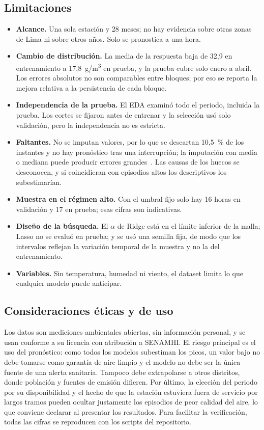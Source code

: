 \subsection{Limitaciones}
\begin{itemize}
\item \textbf{Alcance.} Una sola estación y 28 meses; no hay evidencia sobre otras zonas de Lima ni sobre otros años. Solo se pronostica a una hora.
\item \textbf{Cambio de distribución.} La media de la respuesta baja de 32,9 en entrenamiento a 17,8~\textmu g/m\textsuperscript{3} en prueba, y la prueba cubre solo enero a abril. Los errores absolutos no son comparables entre bloques; por eso se reporta la mejora relativa a la persistencia de cada bloque.
\item \textbf{Independencia de la prueba.} El EDA examinó todo el periodo, incluida la prueba. Los cortes se fijaron antes de entrenar y la selección usó solo validación, pero la independencia no es estricta.
\item \textbf{Faltantes.} No se imputan valores, por lo que se descartan 10,5~\% de los instantes y no hay pronóstico tras una interrupción; la imputación con media o mediana puede producir errores grandes~\cite{hua2024}. Las causas de los huecos se desconocen, y si coincidieran con episodios altos los descriptivos los subestimarían.
\item \textbf{Muestra en el régimen alto.} Con el umbral fijo solo hay 16 horas en validación y 17 en prueba; esas cifras son indicativas.
\item \textbf{Diseño de la búsqueda.} El $\alpha$ de Ridge está en el límite inferior de la malla; Lasso no se evaluó en prueba; y se usó una semilla fija, de modo que los intervalos reflejan la variación temporal de la muestra y no la del entrenamiento.
\item \textbf{Variables.} Sin temperatura, humedad ni viento, el dataset limita lo que cualquier modelo puede anticipar.
\end{itemize}

\subsection{Consideraciones éticas y de uso}
Los datos son mediciones ambientales abiertas, sin información personal, y se usan conforme a su licencia con atribución a SENAMHI. El riesgo principal es el uso del pronóstico: como todos los modelos subestiman los picos, un valor bajo no debe tomarse como garantía de aire limpio y el modelo no debe ser la única fuente de una alerta sanitaria. Tampoco debe extrapolarse a otros distritos, donde población y fuentes de emisión difieren. Por último, la elección del periodo por su disponibilidad y el hecho de que la estación estuviera fuera de servicio por largos tramos pueden ocultar justamente los episodios de peor calidad del aire, lo que conviene declarar al presentar los resultados. Para facilitar la verificación, todas las cifras se reproducen con los scripts del repositorio.
